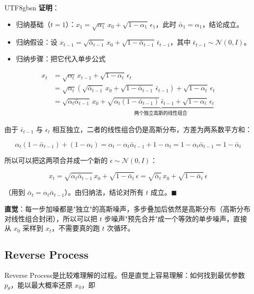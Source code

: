 \documentclass{article}
\begin{document}
\begin{CJK}{UTF8}{gbsn}
\textbf{证明}：

\begin{itemize}
\item 归纳基础（$t=1$）：$x_1 = \sqrt{\alpha_1}\,x_0 + \sqrt{1-\alpha_1}\,\epsilon_1$，此时 $\bar\alpha_1 = \alpha_1$，结论成立。
\item 归纳假设：设 $x_{t-1} = \sqrt{\bar\alpha_{t-1}}\, x_0 + \sqrt{1-\bar\alpha_{t-1}}\, \bar\epsilon_{t-1}$，其中 $\bar\epsilon_{t-1} \sim \mathcal{N}(0,I)$。
\item 归纳步骤：把它代入单步公式
\end{itemize}

\[
\begin{aligned}
x_t &= \sqrt{\alpha_t}\, x_{t-1} + \sqrt{1-\alpha_t}\, \epsilon_t \\
&= \sqrt{\alpha_t}\left(\sqrt{\bar\alpha_{t-1}}\, x_0 + \sqrt{1-\bar\alpha_{t-1}}\, \bar\epsilon_{t-1}\right) + \sqrt{1-\alpha_t}\, \epsilon_t \\
&= \sqrt{\alpha_t \bar\alpha_{t-1}}\, x_0 + \underbrace{\sqrt{\alpha_t(1-\bar\alpha_{t-1})}\, \bar\epsilon_{t-1} + \sqrt{1-\alpha_t}\, \epsilon_t}_{\text{两个独立高斯的线性组合}}
\end{aligned}
\]

由于 $\bar\epsilon_{t-1}$ 与 $\epsilon_t$ 相互独立，二者的线性组合仍是高斯分布，方差为两系数平方和：

\[
\alpha_t(1-\bar\alpha_{t-1}) + (1-\alpha_t) = \alpha_t - \alpha_t\bar\alpha_{t-1} + 1 - \alpha_t = 1 - \alpha_t\bar\alpha_{t-1} = 1-\bar\alpha_t
\]

所以可以把这两项合并成一个新的 $\epsilon \sim \mathcal{N}(0,I)$：

\[
x_t = \sqrt{\alpha_t\bar\alpha_{t-1}}\, x_0 + \sqrt{1-\bar\alpha_t}\, \epsilon = \sqrt{\bar\alpha_t}\, x_0 + \sqrt{1-\bar\alpha_t}\, \epsilon
\]

（用到 $\bar\alpha_t = \alpha_t \bar\alpha_{t-1}$）。由归纳法，结论对所有 $t$ 成立。$\blacksquare$

\textbf{直觉}：每一步加噪都是"独立"的高斯噪声，多步叠加后依然是高斯分布（高斯分布对线性组合封闭），所以可以把 $t$ 步噪声"预先合并"成一个等效的单步噪声，直接从 $x_0$ 采样到 $x_t$，不需要真的跑 $t$ 次循环。

\subsection{Reverse Process}

Reverse Process是比较难理解的过程。但是直觉上容易理解：如何找到最优参数 $p_\theta$，能以最大概率还原 $x_0$，即


\end{CJK}
\end{document}
